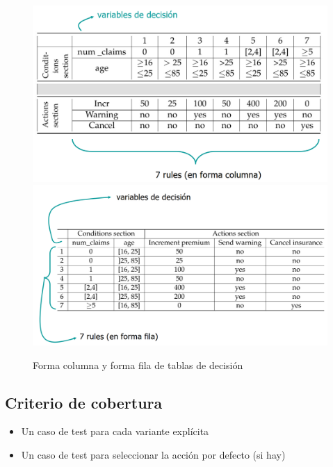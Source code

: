 \begin{figure}[htbp]
   \centering
   \includegraphics{images/05/tablaForma1.png}
   \includegraphics{images/05/tablaForma2.png}
   \caption{Forma columna y forma fila de tablas de decisión}
   \label{fig:05/tablaForma}
\end{figure}

\newpage
\subsection{Criterio de cobertura}
\begin{itemize}
	\item Un caso de test para cada variante explícita
	\item Un caso de test para seleccionar la acción por defecto (si hay)
\end{itemize}


